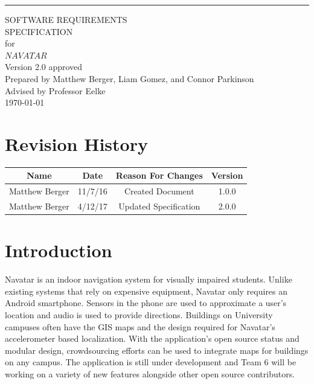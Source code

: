\documentclass{scrreprt}
\date{}
\def\myversion{2.0 }
\begin{document}
\begin{flushright}
    \rule{16cm}{5pt}\vskip1cm
    \begin{bfseries}
        \Huge{SOFTWARE REQUIREMENTS\\ SPECIFICATION}\\
        \vspace{1.6cm}
        for\\
        \vspace{1.6cm}
        $NAVATAR$\\
        \vspace{1.6cm}
        \LARGE{Version \myversion approved}\\
        \vspace{1.6cm}
        Prepared by Matthew Berger, Liam Gomez, and Connor Parkinson\\ 
        \vspace{1.6cm}
        Advised by Professor Eelke\\
        \vspace{1.6cm}
        \today\\
    \end{bfseries}
\end{flushright}

{\small\tableofcontents}

\chapter*{Revision History}

\begin{center}
    \begin{tabular}{|c|c|c|c|}
        \hline
	    Name & Date & Reason For Changes & Version\\
        \hline
	    Matthew Berger & 11/7/16 & Created Document & 1.0.0\\
        \hline
        Matthew Berger & 4/12/17 & Updated Specification & 2.0.0\\
        \hline
    \end{tabular}
\end{center}

\chapter{Introduction}

Navatar is an indoor navigation system for visually impaired students. Unlike existing
systems that rely on expensive equipment, Navatar only requires an Android smartphone.
Sensors in the phone are used to approximate a user's location and audio is used to provide
directions. Buildings on University campuses often have the GIS maps and the design required
for Navatar’s accelerometer based localization. With the application’s open source status and
modular design, crowdsourcing efforts can be used to integrate maps for buildings on any
campus. The application is still under development and Team 6 will be working on a variety of
new features alongside other open source contributors.\\
\end{document}

